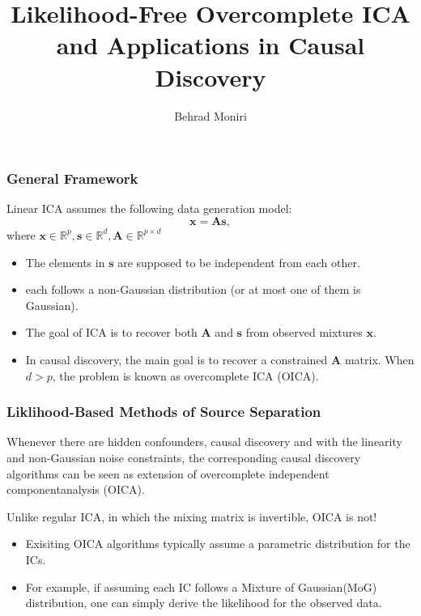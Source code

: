 \documentclass{beamer}
\title[Likelihood-Free Overcomplete ICA]{Likelihood-Free Overcomplete ICA and Applications in Causal Discovery}
\author[Behrad Moniri]{Behrad Moniri}
\institute[Causal AI - EE @ Sharif] 
{
Department of Electrical Engineering\\
Sharif University of Technology 
}
\begin{document}
\begin{frame}
\titlepage
\end{frame}

\begin{frame}
\frametitle{General Framework}
Linear ICA assumes the following data generation model:
\begin{equation}
\label{equ:ica}
\mathbf{x} = \mathbf{As},
\end{equation}
where $\mathbf{x}\in \mathbb{R}^{p}, \mathbf{s}\in \mathbb{R}^{d}, \mathbf{A}\in \mathbb{R}^{p\times d}$

\begin{itemize}
\item
The elements in $\mathbf{s}$ are supposed to be independent from each other.
\item
each follows a non-Gaussian distribution (or at most one of them is Gaussian).
\item
The goal of ICA is to recover both $\mathbf{A}$ and $\mathbf{s}$ from observed mixtures $\mathbf{x}$.

\item
In causal discovery, the main goal is to recover a constrained $\mathbf{A}$ matrix. When $d>p$, the problem is known as overcomplete ICA (OICA).
 \end{itemize}
\end{frame}

\begin{frame}
\frametitle{Liklihood-Based Methods of Source Separation}

Whenever there are hidden confounders, causal discovery and with the linearity and non-Gaussian noise constraints,  the corresponding causal discovery algorithms can be seen as extension of overcomplete independent componentanalysis (OICA). 


Unlike regular ICA, in which the mixing matrix is invertible, OICA is not!

\end{frame}

\begin{frame}
\begin{itemize}
\item
Exisiting OICA algorithms typically assume a parametric distribution for the ICs.
\item
For example, if assuming each IC follows a Mixture of Gaussian(MoG)  distribution,  one  can  simply  derive  the  likelihood  for  the  observed  data.
\end{itemize}
\end{frame}
\end{document}
